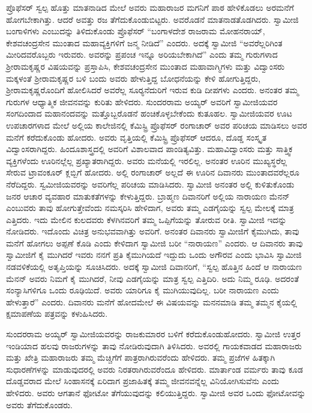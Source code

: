  ಪ್ರೊಫೆಸರ್ ಸ್ವಲ್ಪ ಹೊತ್ತು ಮಾತನಾಡಿದ ಮೇಲೆ ಅವರು ಮಹಾರಾಜರ ಮಗನಿಗೆ ಪಾಠ ಹೇಳಿಕೊಡಲು ಅರಮನೆಗೆ ಹೋಗಬೇಕಾಗಿತ್ತು. ಆದರೆ ಅವತ್ತು ರಜ ತೆಗೆದುಕೊಂಡುಬಿಟ್ಟರು. ಅವರೊಡನೆ ಮಾತನಾಡತೊಡಗಿದರು. ಸ್ವಾಮೀಜಿ ಬಂಗಾಳಿಗಳು ಎಂಬುದನ್ನು ತಿಳಿದುಕೊಂಡು ಪ್ರೊಫೆಸರ್ “ಬಂಗಾಳದೇಶ ರಾಜರಾಮ ಮೋಹನರಾಯ್, ಕೇಶವಚಂದ್ರಸೇನ ಮುಂತಾದ ಮಹಾವ್ಯಕ್ತಿಗಳಿಗೆ ಜನ್ಮ ನೀಡಿದೆ” ಎಂದರು. ಅದಕ್ಕೆ ಸ್ವಾಮೀಜಿ “ಅವರೆಲ್ಲರಿಗಿಂತ ಮೀರಿದವರೊಬ್ಬರು ಇರುವರು. ಅವರನ್ನು ಪ್ರಪಂಚ ಇನ್ನೂ ಅರಿಯಬೇಕಾಗಿದೆ” ಎಂದು ತಮ್ಮ ಗುರುಗಳಾದ ಶ‍್ರೀರಾಮಕೃಷ್ಣರ ವಿಷಯವನ್ನು ಪ್ರಸ್ತಾಪಿಸಿ, ಕೇಶವಚಂದ್ರಸೇನ ಮುಂತಾದ ಮಹಾವಾಗ್ಮಿಗಳು ಮತ್ತು ವಿದ್ವಾಂಸರು ಮಕ್ಕಳಂತೆ ಶ‍್ರೀರಾಮಕೃಷ್ಣರ ಬಳಿ ಬಂದು ಅವರು ಹೇಳುತ್ತಿದ್ದ ಬೋಧನೆಯನ್ನು ಕೇಳಿ ಹೋಗುತ್ತಿದ್ದರು, ಶ‍್ರೀರಾಮಕೃಷ್ಣರೊಂದಿಗೆ ಹೋಲಿಸಿದರೆ ಅವರೆಲ್ಲ ಸೂರ‍್ಯನೆದುರಿಗೆ ಇರುವ ಕುಡಿ ದೀಪಗಳು ಎಂದರು. ಅನಂತರ ತಮ್ಮ ಗುರುಗಳ ಆಧ್ಯಾತ್ಮಿಕ ಜೀವನವನ್ನು ಕುರಿತು ಹೇಳಿದರು. ಸುಂದರರಾಮ ಅಯ್ಯರ್ ಅವರಿಗೆ ಸ್ವಾಮೀಜಿಯವರ ಸಂಗದಿಂದಾದ ಮಹಾನಂದವನ್ನು ಮತ್ತೊಬ್ಬರೊಡನೆ ಹಂಚಿಕೊಳ್ಳಬೇಕೆಂದು ಕುತೂಹಲ. ಸ್ವಾಮೀಜಿಯವರ ಊಟ ಉಪಚಾರಗಳಾದ ಮೇಲೆ ಅಲ್ಲಿಯ ಕಾಲೇಜಿನಲ್ಲಿ ಕೆಮಿಸ್ಟ್ರಿ ಪ್ರೊಫೆಸರ್ ರಂಗಾಚಾರ್ ಅವರ ಪರಿಚಯ ಮಾಡಿಸಲು ಅವರ ಮನೆಗೆ ಕರೆದುಕೊಂಡು ಹೋದರು. ಅವರು ವೃತ್ತಿಯಲ್ಲಿ ಕೆಮಿಸ್ಟ್ರಿ ಪ್ರೊಫೆಸರ್ ಆದರೂ, ದೊಡ್ಡ ಸಂಸ್ಕೃತ ವಿದ್ವಾಂಸರಾಗಿದ್ದರು. ಹಿಂದೂಶಾಸ್ತ್ರದಲ್ಲಿ ಅವರಿಗೆ ವಿಶಾಲವಾದ ಪಾಂಡಿತ್ಯವಿತ್ತು. ಮಹಾವಿದ್ವಾಂಸರು ಮತ್ತು ಸಾತ್ತ್ವಿಕ ವ್ಯಕ್ತಿಗಳೆಂದು ಊರಿನಲ್ಲೆಲ್ಲ ಪ್ರಖ್ಯಾತರಾಗಿದ್ದರು. ಅವರು ಮನೆಯಲ್ಲಿ ಇರಲಿಲ್ಲ. ಅನಂತರ ಊರಿನ ಮುಖ್ಯಸ್ಥರೆಲ್ಲ ಸೇರುವ ಟ್ರಾವಂಕೂರ್ ಕ್ಲಬ್ಬಿಗೆ ಹೋದರು. ಅಲ್ಲಿ ರಂಗಾಚಾರ್ ಅಲ್ಲದೆ ಈ ಊರಿನ ದಿವಾನರು ಮುಂತಾದವರೆಲ್ಲರೂ ನೆರೆದಿದ್ದರು. ಸ್ವಮೀಜಿಯವರನ್ನು ಅವರಿಗೆಲ್ಲ ಪರಿಚಯ ಮಾಡಿಸಿದರು. ಸ್ವಾಮೀಜಿ ಅನಂತರ ಅಲ್ಲಿ ಕುಳಿತುಕೊಂಡು ಜನರ ಆಚಾರ ವ್ಯವಹಾರ ಮಾತುಕತೆಗಳನ್ನು ಕೇಳುತ್ತಿದ್ದರು. ಬ್ರಾಹ್ಮಣ ದಿವಾನರಿಗೆ ಅಲ್ಲಿಯ ನಾರಾಯಣ ಮೆನನ್ ಎಂಬುವರು ತಾವು ಹೋಗುತ್ತೇವೆಂದು ನಮಸ್ಕರಿಸಿ ಹೇಳಿದಾಗ, ಅವರು ತಮ್ಮ ಎಡಗೈಯನ್ನು ಸ್ವಲ್ಪ ಮೇಲಕ್ಕೆ ಮಾತ್ರ ಎತ್ತಿದರು. ಇದು ಮೇಲಿನ ಕುಲದವರು ಕೆಳಗಿನವರಿಗೆ ತಮ್ಮ ಒಪ್ಪಿಗೆಯನ್ನು ತೋರುವ ರೀತಿ. ಸ್ವಾಮೀಜಿ ಇದನ್ನು ನೋಡಿದರು. ಇದೊಂದು ವಿಚಿತ್ರ ಅನುಭವವಾಗಿತ್ತು ಅವರಿಗೆ. ಅನಂತರ ದಿವಾನರು ಸ್ವಾಮೀಜಿಗೆ ಕೈಮುಗಿದು, ತಾವು ಮನೆಗೆ ಹೋಗಲು ಅಪ್ಪಣೆ ಕೊಡಿ ಎಂದು ಕೇಳಿದಾಗ ಸ್ವಾಮೀಜಿ ಬರೀ “ನಾರಾಯಣ” ಎಂದರು. ಆ ದಿವಾನರು ತಾವು ಸ್ವಾಮೀಜಿಗೆ ಕೈ ಮುಗಿದರೆ ಇವರು ನನಗೆ ಪ್ರತಿ ಕೈಮುಗಿಯದೆ ಇದ್ದುದು ಒಂದು ಅಗೌರವ ಎಂದು ಭಾವಿಸಿ ಸ್ವಾಮೀಜಿ ನಡವಳಿಕೆಯಲ್ಲಿ ಅತೃಪ್ತಿಯನ್ನು ಸೂಚಿಸಿದರು. ಅದಕ್ಕೆ ಸ್ವಾಮೀಜಿ ದಿವಾನರಿಗೆ, “ಸ್ವಲ್ಪ ಹೊತ್ತಿನ ಹಿಂದೆ ಆ ನಾರಾಯಣ ಮೆನನ್ ಅವರು ನಿಮಗೆ ಕೈ ಮುಗಿದರೆ, ನೀವು ಎಡಗೈಯನ್ನು ಮಾತ್ರ ಸ್ವಲ್ಪ ಎತ್ತಿದಿರಿ. ಅದು ನಿಮ್ಮ ರೂಢಿ. ಅದರಂತೆ ಸಂನ್ಯಾಸಿಗಳಿಗೂ ಒಂದು ರೂಢಿಯಿದೆ. ಅವರು ಯಾರಿಗೂ ಕೈ ಮುಗಿಯುವುದಿಲ್ಲ. ಬರೀ ನಾರಾಯಣ ಎಂದು ಹೇಳುತ್ತಾರೆ” ಎಂದರು. ದಿವಾನರು ಮನೆಗೆ ಹೋದಮೇಲೆ ಈ ವಿಷಯವನ್ನು ಮನನಮಾಡಿ ತಮ್ಮ ತಮ್ಮನ ಕೈಯಲ್ಲಿ ಕ್ಷಮಾಪಣೆಯ ಪತ್ರವನ್ನು ಕಳುಹಿಸಿದರು. 

 ಸುಂದರರಾಮ ಅಯ್ಯರ್ ಸ್ವಾಮೀಜಿಯವರನ್ನು ರಾಜಕುಮಾರರ ಬಳಿಗೆ ಕರೆದುಕೊಂಡುಹೋದರು. ಸ್ವಾಮೀಜಿ ಉತ್ತರ ಇಂಡಿಯಾದ ಹಲವು ರಾಜರುಗಳನ್ನು ತಾವು ನೋಡಿರುವುದಾಗಿ ತಿಳಿಸಿದರು. ಅವರಲ್ಲಿ ಗಾಯಕವಾಡದ ಮಹಾರಾಜರು ಮತ್ತು ಖೇತ್ರಿ ಮಹಾರಾಜರು ತಮ್ಮ ಮೆಚ್ಚಿಗೆಗೆ ಪಾತ್ರರಾಗಿರುವರೆಂದು ಹೇಳಿದರು. ತಮ್ಮ ಪ್ರಜೆಗಳ ಹಿತಕ್ಕಾಗಿ ಸುಧಾರಣೆಗಳನ್ನು ಮಾಡುವುದರಲ್ಲಿ ಅವರು ನಿರತರಾಗಿರುವರೆಂದೂ ಹೇಳಿದರು. ಮಾರ್ತಾಂಡ ವರ್ಮರು ತಾವು ಕೂಡ ದೊಡ್ಡವರಾದ ಮೇಲೆ ಸಿಂಹಾಸನಕ್ಕೆ ಏರಿದಾಗ ಪ್ರಜಾಹಿತಕ್ಕೆ ತಮ್ಮ ಜೀವನವನ್ನೆಲ್ಲ ವಿನಿಯೋಗಿಸುವೆನು ಎಂದು ಹೇಳಿದರು. ಅವರು ಆಗತಾನೆ ಫೋಟೋ ತೆಗೆಯುವುದನ್ನು ಕಲಿಯುತ್ತಿದ್ದರು. ಸ್ವಾಮೀಜಿ ಅವರ ಒಂದು ಫೋಟೋವನ್ನು ಅವರು ತೆಗೆದುಕೊಂಡರು. 

